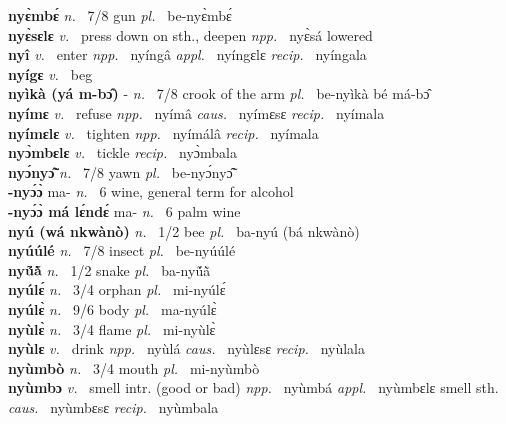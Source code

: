 {\bfseries nyɛ̀mbɛ́}  {\itshape n.~} 7/8 gun {\itshape pl.~} be-nyɛ̀mbɛ́    \\ 
{\bfseries nyɛ̀sɛlɛ}  {\itshape v.~} press down on sth., deepen   {\itshape npp.~} nyɛ̀sá lowered  \\ 
{\bfseries nyî}   {\itshape v.~} enter   {\itshape npp.~} nyíngâ {\itshape appl.~} nyíngɛlɛ {\itshape recip.~} nyíngala  \\ 
{\bfseries nyígɛ}  {\itshape v.~} beg    \\ 
{\bfseries nyìkà (yá m-bɔ̂)} - {\itshape n.~} 7/8 crook of the arm {\itshape pl.~} be-nyìkà bé má-bɔ̂    \\ 
{\bfseries nyímɛ}  {\itshape v.~} refuse   {\itshape npp.~} nyímâ {\itshape caus.~} nyímɛsɛ {\itshape recip.~} nyímala  \\ 
{\bfseries nyímɛlɛ}  {\itshape v.~} tighten   {\itshape npp.~} nyímálâ {\itshape recip.~} nyímala  \\ 
{\bfseries nyɔ̀mbɛlɛ}  {\itshape v.~} tickle   {\itshape recip.~} nyɔ̀mbala  \\ 
{\bfseries nyɔ́nyɔ̃̂}  {\itshape n.~} 7/8 yawn {\itshape pl.~} be-nyɔ́nyɔ̃̂    \\ 
{\bfseries -nyɔ́ɔ̀} ma- {\itshape n.~} 6 wine, general term for alcohol    \\ 
{\bfseries -nyɔ́ɔ̀ má lɛ́ndɛ́} ma- {\itshape  n.~} 6 palm wine    \\ 
{\bfseries nyú (wá nkwànò)}  {\itshape n.~} 1/2 bee {\itshape pl.~} ba-nyú (bá nkwànò)    \\ 
{\bfseries nyúúlé}  {\itshape n.~} 7/8 insect {\itshape pl.~} be-nyúúlé    \\ 
{\bfseries nyṹã̀}  {\itshape n.~} 1/2 snake {\itshape pl.~} ba-nyṹã̀    \\ 
{\bfseries nyúlɛ́}  {\itshape n.~} 3/4 orphan {\itshape pl.~} mi-nyúlɛ́    \\ 
{\bfseries nyúlɛ̀}  {\itshape n.~} 9/6 body {\itshape pl.~} ma-nyúlɛ̀    \\ 
{\bfseries nyùlɛ̀}  {\itshape n.~} 3/4 flame {\itshape pl.~} mi-nyùlɛ̀    \\ 
{\bfseries nyùlɛ}  {\itshape v.~} drink   {\itshape npp.~} nyùlá {\itshape caus.~} nyùlɛsɛ {\itshape recip.~} nyùlala  \\ 
{\bfseries nyùmbò}  {\itshape n.~} 3/4 mouth {\itshape pl.~} mi-nyùmbò    \\ 
{\bfseries nyùmbɔ}  {\itshape v.~} smell intr. (good or bad)   {\itshape npp.~} nyùmbá {\itshape appl.~} nyùmbɛlɛ smell sth. {\itshape caus.~} nyùmbɛsɛ {\itshape recip.~} nyùmbala  \\ 
